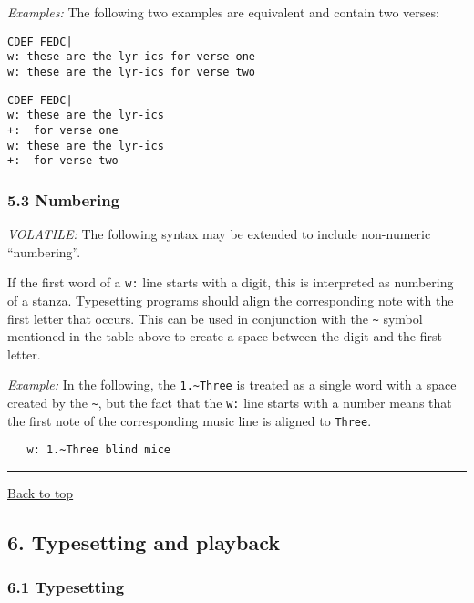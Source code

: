 \emph{Examples:} The following two examples are equivalent and contain
two verses:

\begin{verbatim}
CDEF FEDC|
w: these are the lyr-ics for verse one
w: these are the lyr-ics for verse two
\end{verbatim}

\begin{verbatim}
CDEF FEDC|
w: these are the lyr-ics
+:  for verse one
w: these are the lyr-ics
+:  for verse two  
\end{verbatim}

\hypertarget{numbering}{\subsubsection{5.3 Numbering}\label{numbering}}

\emph{VOLATILE:} The following syntax may be extended to include
non-numeric ``numbering''.

If the first word of a \texttt{w:} line starts with a digit, this is
interpreted as numbering of a stanza. Typesetting programs should align
the corresponding note with the first letter that occurs. This can be
used in conjunction with the \texttt{\textasciitilde{}} symbol mentioned
in the table above to create a space between the digit and the first
letter.

\emph{Example:} In the following, the \texttt{1.\textasciitilde{}Three}
is treated as a single word with a space created by the
\texttt{\textasciitilde{}}, but the fact that the \texttt{w:} line
starts with a number means that the first note of the corresponding
music line is aligned to \texttt{Three}.

\begin{verbatim}
   w: 1.~Three blind mice
\end{verbatim}

\begin{center}\rule{0.5\linewidth}{\linethickness}\end{center}

\protect\hyperlink{}{Back to top}

\hypertarget{typesetting_and_playback}{\subsection{6. Typesetting and
playback}\label{typesetting_and_playback}}

\hypertarget{typesetting}{\subsubsection{6.1
Typesetting}\label{typesetting}}

